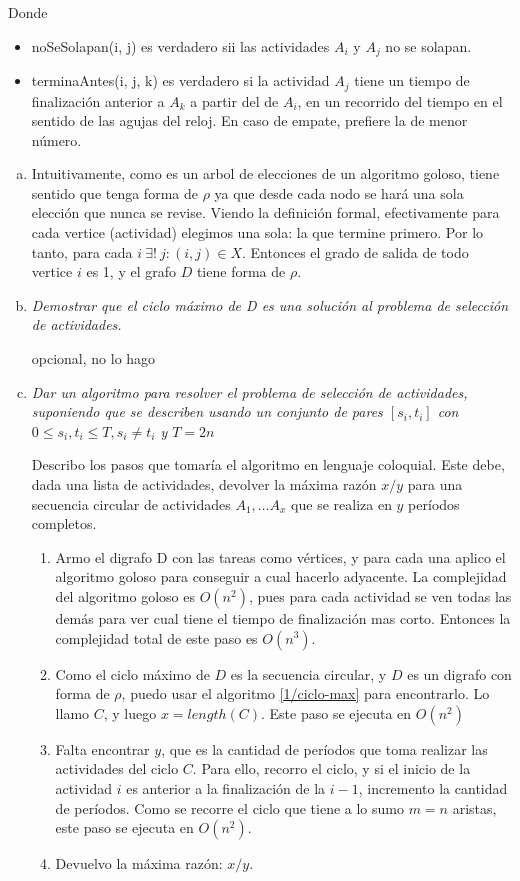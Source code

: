 \documentclass[12pt, a4paper]{report}
\theoremstyle{definition} %
\begin{document}
Donde
\begin{itemize}
    \item noSeSolapan(i, j) es verdadero sii las actividades $A_i$ y $A_j$ no se solapan.
    \item terminaAntes(i, j, k) es verdadero si la actividad $A_j$ tiene un tiempo de finalización anterior a $A_k$ a partir del de $A_i$, en un recorrido del tiempo en el sentido de las agujas del reloj. En caso de empate, prefiere la de menor número.
\end{itemize}

\begin{enumerate}[a), resume]
\item Intuitivamente, como es un arbol de elecciones de un algoritmo goloso, tiene sentido que tenga forma de $\rho$ ya que desde cada nodo se hará una sola elección que nunca se revise. Viendo la definición formal, efectivamente para cada vertice (actividad) elegimos una sola: la que termine primero. Por lo tanto, para cada $i\ \exists!\ j : (i, j) \in X$. Entonces el grado de salida de todo vertice $i$ es 1, y el grafo $D$ tiene forma de $\rho$.

\item \textit{Demostrar que el ciclo máximo de D es una solución al problema de selección de actividades.}

opcional, no lo hago

\item \textit{Dar un algoritmo para resolver el problema de selección de actividades, suponiendo que se describen usando un conjunto de pares $[s_i, t_i]$ con $0 \leq s_i, t_i \leq T, s_i \neq t_i$ y $T = 2n$}

    Describo los pasos que tomaría el algoritmo en lenguaje coloquial. Este debe, dada una lista de actividades, devolver la máxima razón $x / y$ para una secuencia circular de actividades $A_1, \ldots A_x$ que se realiza en $y$ períodos completos.

    \begin{enumerate}[1.]
        \item Armo el digrafo D con las tareas como vértices, y para cada una aplico el algoritmo goloso para conseguir a cual hacerlo adyacente. La complejidad del algoritmo goloso es $O(n^2)$, pues para cada actividad se ven todas las demás para ver cual tiene el tiempo de finalización mas corto. Entonces la complejidad total de este paso es $O(n^3)$.
        \item Como el ciclo máximo de $D$ es la secuencia circular, y $D$ es un digrafo con forma de $\rho$, puedo usar el algoritmo \ref{1/ciclo-max} para encontrarlo. Lo llamo $C$, y luego $x = length(C)$. Este paso se ejecuta en $O(n^2)$
        \item Falta encontrar $y$, que es la cantidad de períodos que toma realizar las actividades del ciclo $C$. Para ello, recorro el ciclo, y si el inicio de la actividad $i$ es anterior a la finalización de la $i-1$, incremento la cantidad de períodos. Como se recorre el ciclo que tiene a lo sumo $m = n$ aristas, este paso se ejecuta en $O(n^2)$.
        \item Devuelvo la máxima razón: $x / y$.
    \end{enumerate}


\end{enumerate}
\end{document}
